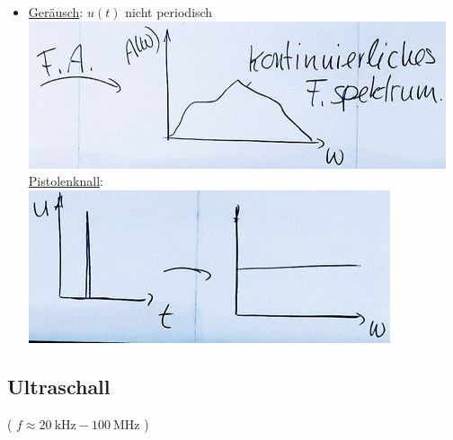 \begin{itemize}
	\item \uline{Geräusch}: $u(t)$ nicht periodisch \\
		\includegraphics{Bild237} \\
		\uline{Pistolenknall}: \\
		\includegraphics{Bild238}
\end{itemize}

\subsection{Ultraschall}
( $f \approx \SI{20}{\kilo\hertz} - \SI{100}{\mega\hertz}$ )


